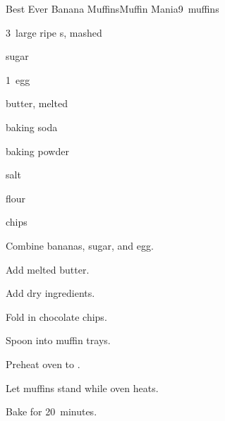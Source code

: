 \begin{recipe}{Best Ever Banana Muffins}{Muffin Mania}{9~muffins}

\begin{ingredients}
\item 3~large ripe s, mashed
\item \C{\threequarter} sugar
\item 1~egg
\item \C{\third} butter, melted
\item {} baking soda
\item {} baking powder
\item \tp{\half} salt
\item \C{1\half} flour
\item \C{\half}  chips
\end{ingredients}

\begin{directions}
\item Combine bananas, sugar, and egg.
\item Add melted butter.
\item Add dry ingredients.
\item Fold in chocolate chips.
\item Spoon into muffin trays.
\item Preheat oven to .
\item Let muffins stand while oven heats.
\item Bake for 20~minutes.
\end{directions}

\end{recipe}
